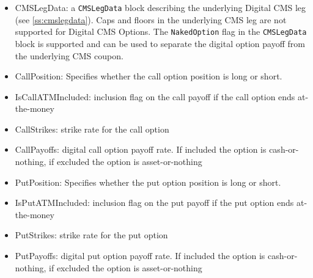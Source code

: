\begin{itemize}
\item CMSLegData: a \lstinline!CMSLegData! block describing the underlying Digital CMS leg (see \ref{ss:cmslegdata}).
Caps and floors in the underlying CMS leg are not supported for Digital CMS Options. The \lstinline!NakedOption! flag in the
\lstinline!CMSLegData! block is supported and can be used to separate the digital option payoff from the underlying CMS coupon.
\item CallPosition: Specifies whether the call option position is long or short.
\item IsCallATMIncluded: inclusion flag on the call payoff if the call option ends at-the-money
\item CallStrikes: strike rate for the call option
\item CallPayoffs: digital call option payoff rate. If included the option is cash-or-nothing, if excluded the option is asset-or-nothing
\item PutPosition: Specifies whether the put option position is long  or short.
\item IsPutATMIncluded: inclusion flag on the put payoff if the put option ends at-the-money
\item PutStrikes: strike rate for the put option
\item PutPayoffs: digital put option payoff rate. If included the option is cash-or-nothing, if excluded the option is asset-or-nothing
\end{itemize}
